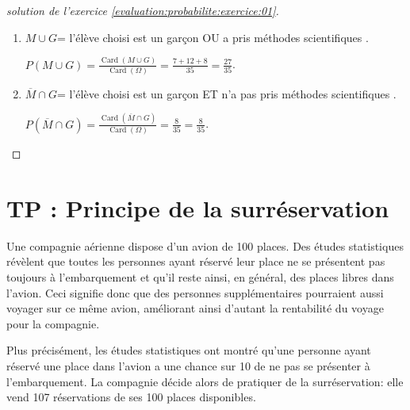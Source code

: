 \documentclass[main.tex]{subfiles}
\begin{document}
\begin{proof}[solution de l'exercice \ref{evaluation:probabilite:exercice:01}]
\begin{enumerate}[label={\arabic*)},leftmargin=*]
		$P(M\cap G)=\frac{\operatorname{Card}(M\cap G)}{\operatorname{Card}(\Omega)}=\frac{7}{35}$. 
		\item  $M \cup G$= \og l'élève choisi est un garçon OU a   pris méthodes scientifiques \fg.
		
		$P(M\cup G)=\frac{\operatorname{Card}(M\cup G)}{\operatorname{Card}(\Omega)}=\frac{7+12+8}{35}=\frac{27}{35}$.
		\item $\overline{M} \cap G$= \og l'élève choisi est un garçon ET n'a pas pris méthodes scientifiques \fg.
		
		$P(\overline{M}\cap G)=\frac{\operatorname{Card}(\overline{M}\cap G)}{\operatorname{Card}(\Omega)}=\frac{8}{35}=\frac{8}{35}$. 
	\end{enumerate}
\end{proof}






%	 
\newpage
\section{TP : Principe de la surréservation}
 Une compagnie aérienne dispose d'un avion de 100 places. Des études statistiques révèlent que toutes les personnes ayant réservé leur place ne se présentent pas toujours à l'embarquement et qu'il reste ainsi, en général, des places libres dans l'avion.
 Ceci signifie donc que des personnes supplémentaires pourraient aussi voyager sur ce même avion, améliorant ainsi d'autant la rentabilité du voyage pour la compagnie.

Plus précisément, les études statistiques ont montré qu'une personne ayant réservé une place dans l'avion a une chance sur 10 de ne pas se présenter à l'embarquement. La compagnie décide alors de pratiquer de la \og surréservation\fg : elle vend 107 réservations de ses 100 places disponibles.
 
\end{document}
